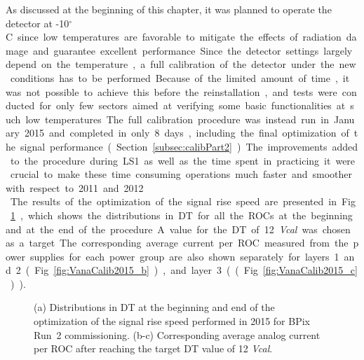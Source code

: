 As discussed at the beginning of this chapter, it was planned to operate the detector at -10\unit{$^\circ$C} since low temperatures
are favorable to mitigate the effects of radiation damage and guarantee excellent performance.
Since the detector settings largely depend on the temperature, a full calibration of the detector under the new conditions has to be performed.
Because of the limited amount of time, it was not possible to achieve this before the reinstallation, and tests were conducted for only few sectors aimed at verifying some basic functionalities at such low temperatures.
The full calibration procedure was instead run in January 2015 and completed in only 8 days, including the final optimization of the signal performance (Section~\ref{subsec:calibPart2}).
The improvements added to the procedure during LS1 as well as the time spent in practicing it 
were crucial to make these time consuming operations much faster and smoother with respect to 2011 and 2012.\\

The results of the optimization of the signal rise speed are presented in Fig.~\ref{fig:VanaCalib2015}, which shows the 
distributions in DT for all the ROCs at the beginning and at the end of the procedure. A value for the DT of 12 \textit{Vcal} was chosen as a target.
The corresponding average current per ROC measured from the power supplies for each power group are also shown separately for layers 1 and 2 (Fig.~\ref{fig:VanaCalib2015_b}), and layer 3 ((Fig.~\ref{fig:VanaCalib2015_c})).

\begin{figure}[!htb]
 \begin{center}
 \end{center}
 \caption{(a) Distributions in DT at the beginning and end of the optimization of the signal rise speed performed in 2015 for BPix Run~2 commissioning. (b-c) Corresponding average analog current per ROC after reaching the target DT value of 12 \textit{Vcal}.}
 \label{fig:VanaCalib2015}
\end{figure}

